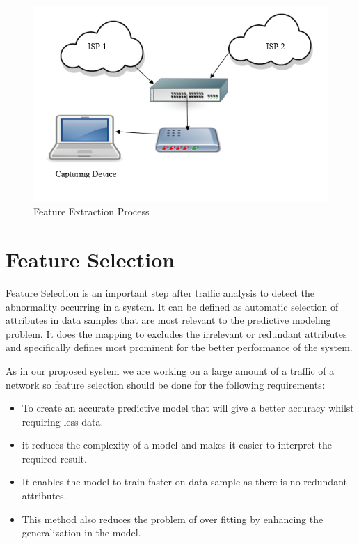 \begin{figure}[ht]
    \centering
    \includegraphics[width=5in]{Chap4/FeatureExtraction.PNG}
    \caption{Feature Extraction Process}
    \label{fig:feature_extraction}
\end{figure}
\section{Feature Selection}

Feature Selection is an important step after traffic analysis to detect the abnormality occurring in a system. It can be defined as automatic selection of attributes in data samples that are most relevant to the predictive modeling problem. It does the mapping to excludes the irrelevant or redundant attributes and specifically defines most prominent for the better performance of the system.

As in our proposed system we are working on a large amount of a traffic of a network so feature selection should be done for the following requirements:
\begin{itemize}
    \item To create an accurate predictive model that will give a better accuracy whilst requiring less data.
    \item it reduces the complexity of a model and makes it easier to interpret the required result.
    \item It enables the model to train faster on data sample as there is no redundant attributes.
    \item This method also reduces the problem of over fitting by enhancing the generalization in the model.
\end{itemize}
